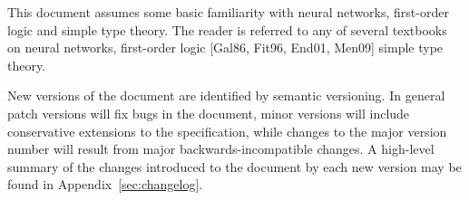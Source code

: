 This document assumes some basic familiarity with neural networks, first-order logic and simple type theory. The reader is referred to any of several textbooks on neural networks, first-order logic [Gal86, Fit96, End01, Men09] simple type theory. 

New versions of the document are identified by semantic versioning. In general patch versions will fix bugs in the document, minor versions will include conservative extensions to the specification, while changes to the major version number will result from major backwards-incompatible changes.
A high-level summary of the changes introduced to the document by each new version may be found in Appendix~\ref{sec:changelog}.
